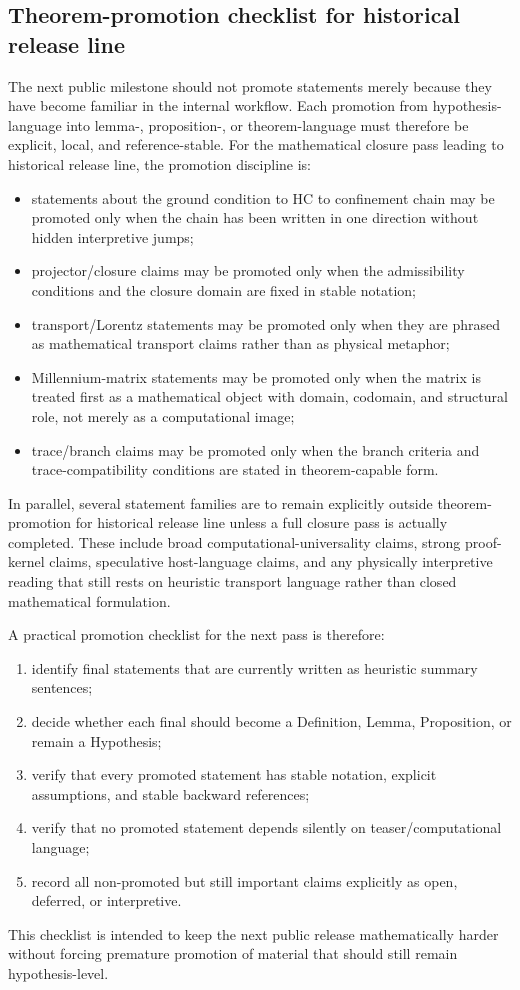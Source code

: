 \documentclass[12pt,a4paper]{article}
\DeclareRobustCommand{\QSCver}[1]{archival stage}
\renewcommand{\QSCver}[1]{historical release line}
\begin{document}
\subsection*{Theorem-promotion checklist for \QSCver{v2.27.0}}
The next public milestone should not promote statements merely because they have become familiar in the internal workflow. Each promotion from hypothesis-language into lemma-, proposition-, or theorem-language must therefore be explicit, local, and reference-stable. For the mathematical closure pass leading to \QSCver{v2.27.0}, the promotion discipline is:
\begin{itemize}[leftmargin=*]
 \item statements about the ground condition to HC to confinement chain may be promoted only when the chain has been written in one direction without hidden interpretive jumps;
 \item projector/closure claims may be promoted only when the admissibility conditions and the closure domain are fixed in stable notation;
 \item transport/Lorentz statements may be promoted only when they are phrased as mathematical transport claims rather than as physical metaphor;
 \item Millennium-matrix statements may be promoted only when the matrix is treated first as a mathematical object with domain, codomain, and structural role, not merely as a computational image;
 \item trace/branch claims may be promoted only when the branch criteria and trace-compatibility conditions are stated in theorem-capable form.
\end{itemize}
In parallel, several statement families are to remain explicitly outside theorem-promotion for \QSCver{v2.27.0} unless a full closure pass is actually completed. These include broad computational-universality claims, strong proof-kernel claims, speculative host-language claims, and any physically interpretive reading that still rests on heuristic transport language rather than closed mathematical formulation.

A practical promotion checklist for the next pass is therefore:
\begin{enumerate}[leftmargin=*]
 \item identify final statements that are currently written as heuristic summary sentences;
 \item decide whether each final should become a Definition, Lemma, Proposition, or remain a Hypothesis;
 \item verify that every promoted statement has stable notation, explicit assumptions, and stable backward references;
 \item verify that no promoted statement depends silently on teaser/computational language;
 \item record all non-promoted but still important claims explicitly as open, deferred, or interpretive.
\end{enumerate}
This checklist is intended to keep the next public release mathematically harder without forcing premature promotion of material that should still remain hypothesis-level.
\end{document}
